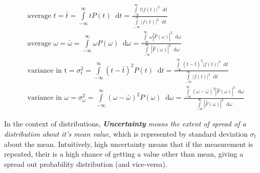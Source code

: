 \documentclass[11pt, a4paper]{article}
\newcommand{\variance}[1]{\sigma_{#1}^{2}}
\newcommand{\stdev}[1]{\sigma_{#1}}
\newcommand{\diff}{\mathop{}\!\mathrm{d}}
\newcommand{\dt}{\diff t}
\newcommand{\domega}{\diff \omega}
\newcommand{\dint}[2]{\int \limits_{#1}^{#2}}  %
\newcommand{\intinfty}{\dint{-\infty}{\infty}}	%
\begin{document}
	\begin{subequations}
		\begin{align}
			& \text{average } t = \bar{t} = \intinfty t P(t) \dt = \frac{\intinfty t |f(t)|^{2} \dt}{\intinfty |f(t)|^{2} \dt} \label{eq:avg_t} \\
			& \text{average } \omega = \bar{\omega} = \intinfty \omega P(\omega) \domega = \frac{\intinfty \omega |\hat{F}(\omega)|^{2} \domega}{\intinfty |\hat{F}(\omega)|^{2} \domega} \label{eq:avg_omega} \\
			& \text{variance in t} = \variance{t} = \intinfty (t - \bar{t})^{2} P(t) \dt = \frac{\intinfty (t - \bar{t})^{2} |f(t)|^{2} \dt}{\intinfty |f(t)|^{2} \dt} \label{eq:variance_t} \\
			& \text{variance in $\omega$} = \variance{\omega} = \intinfty (\omega - \bar{\omega})^{2} P(\omega) \domega = \frac{\intinfty (\omega - \bar{\omega})^{2} |\hat{F}(\omega)|^{2} \domega}{\intinfty |\hat{F}(\omega)|^{2} \domega} \label{eq:variance_omega}
		\end{align}
	\end{subequations}
	
	In the context of distributions, \textit{\textbf{Uncertainty} means the extent of spread of a distribution about it's mean value}, which is represented by standard deviation $\stdev{t}$ about the mean. Intuitively, high uncertainty means that if the measurement is repeated, their is a high chance of getting a value other than mean, giving a spread out probability distribution (and vice-versa).
	
\end{document}
